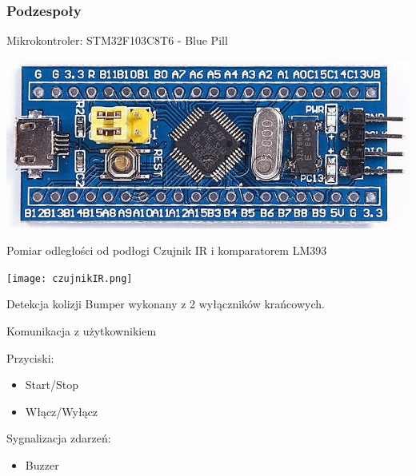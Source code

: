 \begin{frame}
\frametitle{Podzespoły}
\scriptsize
\begin{minipage}{0.45\textwidth}
\begin{block}{Mikrokontroler: STM32F103C8T6 - Blue Pill}
\begin{center}
\includegraphics[scale=0.22]{bluepill.jpg}\hspace{12mm}
\end{center}
\end{block}
\end{minipage}
\hspace{5mm}
\begin{minipage}{0.45\textwidth}
\begin{block}{Pomiar odległości od podłogi}
	Czujnik IR i komparatorem LM393
	\begin{center}
		\texttt{[image: czujnikIR.png]}\hspace{12mm}
	\end{center}
\end{block}
\end{minipage}
\begin{block}{Detekcja kolizji}
	Bumper wykonany z 2 wyłączników krańcowych.
\end{block}
\begin{block}{Komunikacja z użytkownikiem}
	\begin{minipage}{0.49\textwidth}
	Przyciski:
	\begin{itemize}
		\item Start/Stop
		\item Włącz/Wyłącz
	\end{itemize}
\end{minipage}
\begin{minipage}{0.49\textwidth}
	Sygnalizacja zdarzeń:
	\begin{itemize}
		\item Buzzer
	\end{itemize}
\end{minipage}
\end{block}
\end{frame}

